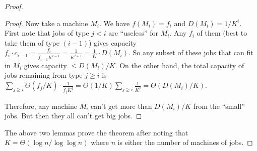 \begin{proof}
\begin{proof}
		
		Now take a machine $M_i$. We have $f(M_i) = f_i$ and $D(M_i) = 1/K^i$. 
		First note that jobs of type $j < i$ are ``useless'' for $M_i$. Any $f_i$ of them (best to take them of type $(i-1)$)  gives capacity $f_i\cdot c_{i-1}  = \frac{f_i}{f_{i-1}K^{i-1}} = \frac{1}{K^{i+1}} =  \frac{1}{K}\cdot D(M_i)$. So any subset of these jobs that can fit in $M_i$ gives capacity $\leq D(M_i)/K$.
		On the other hand, the total capacity of jobs remaining from type $j \geq i$ is  $\sum_{j\geq i} \Theta(f_j/K)\cdot \frac{1}{f_jK^j} = \Theta(1/K)\sum_{j\geq i} \frac{1}{K^j} = \Theta(D(M_i)/K)$.
		
		Therefore, any machine $M_i$ can't get more than $D(M_i)/K$ from the ``small'' jobs. But then they all can't get big jobs. 
	\end{proof}
	The above two lemmas prove the theorem after noting that $K = \Theta(\log n/\log\log n)$ where $n$ is either the number of machines of jobs.
\end{proof}
